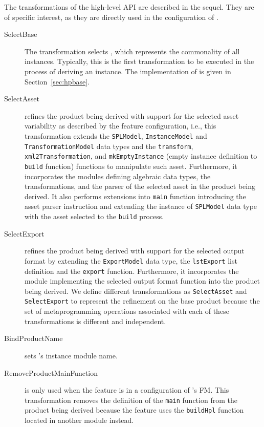 The transformations of the high-level API are described in the sequel. They are of specific interest, as they are directly used in the configuration of \hpl. 

\begin{description}

\item[SelectBase] The transformation selects \hpbase{}, which represents the commonality of all \hpl{} instances.
Typically, this is the first transformation to be executed in the process of deriving an instance. The implementation of \hpbase{} is given in Section~\ref{sec:hpbase}.

\item[SelectAsset] refines the product being derived with support for the selected asset variability as described by the feature configuration, i.e., this transformation extends the \texttt{SPLModel}, \texttt{InstanceModel} and \texttt{TransformationModel} data types and the \texttt{transform}, \texttt{xml2Transformation}, and \texttt{mkEmptyInstance} (empty instance definition to \texttt{build} function) functions to manipulate such asset. Furthermore, it incorporates the modules defining algebraic data types, the transformations, and the parser of the selected asset in the product being derived.  It also performs extensions into \texttt{main} function introducing the asset parser instruction and extending the instance of \texttt{SPLModel} data type with the asset selected to the \texttt{build} process.

\item[SelectExport] refines the product being derived with support for the selected output format by extending the \texttt{ExportModel} data type, the \texttt{lstExport} list definition and the \texttt{export} function. Furthermore, it incorporates the module implementing the selected output format function into the product being derived. We define different transformations as \texttt{SelectAsset} and \texttt{SelectExport} to represent the refinement on the base product because the set of metaprogramming operations associated with each of these \hpl{} transformations is different and independent.

\item[BindProductName] sets \hpl{}'s instance module name.

\item[RemoveProductMainFunction] is only used when the \hp{} feature is in a configuration of \hpl's FM. This transformation removes the definition of the \texttt{main} function from the product being derived because the \hp{} feature uses the \texttt{buildHpl} function located in another module instead.


\end{description}
